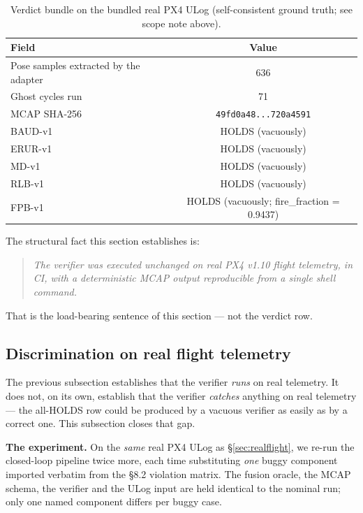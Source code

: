 \documentclass[acmsmall,nonacm=true,review=false]{acmart}
\theoremstyle{plain}
\begin{document}
\begin{table}[h]
\centering
\small
\begin{tabular}{lc}
\toprule
\textbf{Field} & \textbf{Value} \\
\midrule
Pose samples extracted by the adapter & 636 \\
Ghost cycles run                      & 71 \\
MCAP SHA-256                          & \texttt{49fd0a48...720a4591} \\
BAUD-v1                                & HOLDS (vacuously) \\
ERUR-v1                                & HOLDS (vacuously) \\
MD-v1                                  & HOLDS (vacuously) \\
RLB-v1                                 & HOLDS (vacuously) \\
FPB-v1                                 & HOLDS (vacuously; fire\_fraction = 0.9437) \\
\bottomrule
\end{tabular}
\caption{Verdict bundle on the bundled real PX4 ULog
(self-consistent ground truth; see scope note above).}
\label{tab:real-verdict}
\end{table}

The structural fact this section establishes is:

\begin{quote}
\itshape
The verifier was executed unchanged on real PX4 v1.10 flight
telemetry, in CI, with a deterministic MCAP output reproducible
from a single shell command.
\end{quote}

That is the load-bearing sentence of this section --- not the
verdict row.

\subsection{Discrimination on real flight telemetry}
\label{sec:realflight-discrim}

The previous subsection establishes that the verifier \emph{runs}
on real telemetry. It does not, on its own, establish that the
verifier \emph{catches} anything on real telemetry --- the
all-HOLDS row could be produced by a vacuous verifier as easily
as by a correct one. This subsection closes that gap.

\textbf{The experiment.} On the \emph{same} real PX4 ULog as
\S\ref{sec:realflight}, we re-run the closed-loop pipeline twice
more, each time substituting \emph{one} buggy component imported
verbatim from the \S8.2 violation matrix. The fusion oracle, the
MCAP schema, the verifier and the ULog input are held identical
to the nominal run; only one named component differs per buggy
case.
\end{document}

